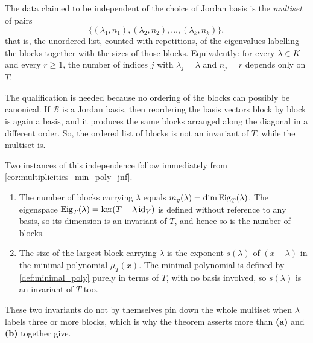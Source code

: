 \begin{exercisesolution}
\label{sol:jnf_uniqueness_meaning}
The data claimed to be independent of the choice of Jordan basis is the \emph{multiset} of pairs
\[ \{ (\lambda_1, n_1), (\lambda_2, n_2), \dots, (\lambda_k, n_k) \}, \]
that is, the unordered list, counted with repetitions, of the eigenvalues labelling the blocks together with the sizes of those blocks. Equivalently: for every $\lambda \in K$ and every $r \ge 1$, the number of indices $j$ with $\lambda_j = \lambda$ and $n_j = r$ depends only on $T$.

The qualification  is needed because no ordering of the blocks can possibly be canonical. If $\mathcal{B}$ is a Jordan basis, then reordering the basis vectors block by block is again a basis, and it produces the same blocks arranged along the diagonal in a different order. So, the ordered list of blocks is not an invariant of $T$, while the multiset is.

Two instances of this independence follow immediately from \cref{cor:multiplicities_min_poly_jnf}.
\begin{enumerate}[label=\textbf{(\alph*)}]
    \item The number of blocks carrying $\lambda$ equals $m_g(\lambda) = \dim \operatorname{Eig}_T(\lambda)$. The eigenspace $\operatorname{Eig}_T(\lambda) = \ker(T - \lambda \operatorname{id}_V)$ is defined without reference to any basis, so its dimension is an invariant of $T$, and hence so is the number of blocks.
    \item The size of the largest block carrying $\lambda$ is the exponent $s(\lambda)$ of $(x - \lambda)$ in the minimal polynomial $\mu_T(x)$. The minimal polynomial is defined by \cref{def:minimal_poly} purely in terms of $T$, with no basis involved, so $s(\lambda)$ is an invariant of $T$ too.
\end{enumerate}
These two invariants do not by themselves pin down the whole multiset when $\lambda$ labels three or more blocks, which is why the theorem asserts more than \textbf{(a)} and \textbf{(b)} together give.
\end{exercisesolution}

